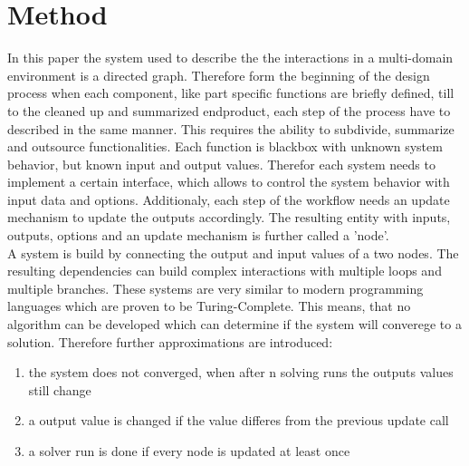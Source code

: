 \section{Method}
In this paper the system used to describe the the interactions in a multi-domain
environment is a directed graph.
Therefore form the beginning of the design process when each component, 
like part specific functions are briefly defined, till to the cleaned up and summarized endproduct,
each step of the process have to described in the same manner.
This requires the ability to subdivide, summarize and outsource functionalities. 
Each function is blackbox with unknown system behavior, but known input and output values.
Therefor each system needs to implement a certain interface, 
which allows to control the system behavior with input data and options.
Additionaly, each step of the workflow needs an update mechanism to update the outputs accordingly.
The resulting entity with inputs, outputs, options and an update mechanism is further called a 'node'.\\
A system is build by connecting the output and input values of a two nodes.
The resulting dependencies can build complex interactions with multiple loops and multiple branches.
These systems are very similar to modern programming languages which are proven to be Turing-Complete.
This means, that no algorithm can be developed which can determine if the system will converege to a solution.
Therefore further approximations are introduced:
\begin{enumerate}
    \item the system does not converged, when after n solving runs the outputs values still change
    \item a output value is changed if the value differes from the previous update call
    \item a solver run is done if every node is updated at least once
\end{enumerate}

